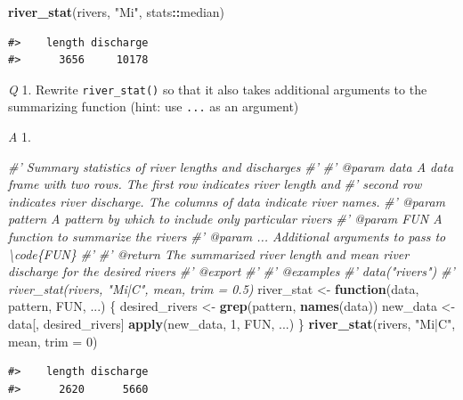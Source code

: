 \documentclass[
]{book}
\newenvironment{Shaded}{\begin{snugshade}}{\end{snugshade}}
\newcommand{\CommentTok}[1]{\textcolor[rgb]{0.56,0.35,0.01}{\textit{#1}}}
\newcommand{\ControlFlowTok}[1]{\textcolor[rgb]{0.13,0.29,0.53}{\textbf{#1}}}
\newcommand{\DataTypeTok}[1]{\textcolor[rgb]{0.13,0.29,0.53}{#1}}
\newcommand{\DecValTok}[1]{\textcolor[rgb]{0.00,0.00,0.81}{#1}}
\newcommand{\KeywordTok}[1]{\textcolor[rgb]{0.13,0.29,0.53}{\textbf{#1}}}
\newcommand{\NormalTok}[1]{#1}
\newcommand{\OperatorTok}[1]{\textcolor[rgb]{0.81,0.36,0.00}{\textbf{#1}}}
\newcommand{\StringTok}[1]{\textcolor[rgb]{0.31,0.60,0.02}{#1}}
\begin{document}
\begin{Shaded}
\begin{Highlighting}[]
\KeywordTok{river_stat}\NormalTok{(rivers, }\StringTok{"Mi"}\NormalTok{, stats}\OperatorTok{::}\NormalTok{median)}
\end{Highlighting}
\end{Shaded}

\begin{verbatim}
#>    length discharge 
#>      3656     10178
\end{verbatim}

\emph{Q} 1. Rewrite \texttt{river\_stat()} so that it also takes additional arguments to the summarizing function (hint: use \texttt{...} as an argument)

\emph{A} 1.

\begin{Shaded}
\begin{Highlighting}[]
\CommentTok{#' Summary statistics of river lengths and discharges}
\CommentTok{#'}
\CommentTok{#' @param data A data frame with two rows. The first row indicates river length and}
\CommentTok{#'   second row indicates river discharge. The columns of data indicate river names.}
\CommentTok{#' @param pattern A pattern by which to include only particular rivers}
\CommentTok{#' @param FUN A function to summarize the rivers}
\CommentTok{#' @param ... Additional arguments to pass to \textbackslash{}code\{FUN\}}
\CommentTok{#'}
\CommentTok{#' @return The summarized river length and mean river discharge for the desired rivers}
\CommentTok{#' @export}
\CommentTok{#'}
\CommentTok{#' @examples}
\CommentTok{#' data("rivers")}
\CommentTok{#' river_stat(rivers, "Mi|C", mean, trim = 0.5)}
\NormalTok{river_stat <-}\StringTok{ }\ControlFlowTok{function}\NormalTok{(data, pattern, FUN, ...) \{}
\NormalTok{  desired_rivers <-}\StringTok{ }\KeywordTok{grep}\NormalTok{(pattern, }\KeywordTok{names}\NormalTok{(data))}
\NormalTok{  new_data <-}\StringTok{ }\NormalTok{data[, desired_rivers]}
  \KeywordTok{apply}\NormalTok{(new_data, }\DecValTok{1}\NormalTok{, FUN, ...)}
\NormalTok{\}}
\KeywordTok{river_stat}\NormalTok{(rivers, }\StringTok{"Mi|C"}\NormalTok{, mean, }\DataTypeTok{trim =} \DecValTok{0}\NormalTok{)}
\end{Highlighting}
\end{Shaded}

\begin{verbatim}
#>    length discharge 
#>      2620      5660
\end{verbatim}
\end{document}

